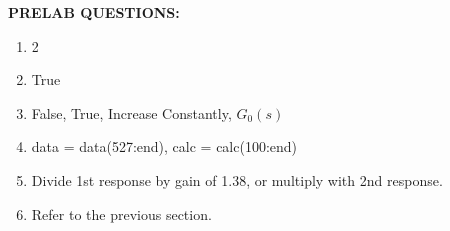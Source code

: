 \documentclass[11pt,a4paper]{article}
\begin{document}
\pagebreak
\textbf{PRELAB QUESTIONS:}
\begin{enumerate}
	\item 2
	\item True
	\item False, True, Increase Constantly, $G_0(s)$
	\item data = data(527:end), calc = calc(100:end)
	\item Divide 1st response by gain of 1.38, or multiply with 2nd response. 
	\item Refer to the previous section. 
\end{enumerate}





\pagebreak
\end{document}
